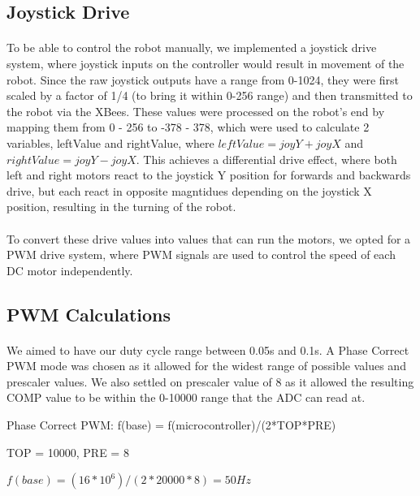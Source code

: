 \documentclass[12pt, a4paper]{article}
\begin{document}
    \subsection{Joystick Drive}
      \paragraph{}
      To be able to control the robot manually, we implemented a joystick drive system, where joystick inputs on the controller would result in movement of the robot. Since the raw joystick outputs have a range from 0-1024, they were first scaled by a factor of 1/4 (to bring it within 0-256 range) and then transmitted to the robot via the XBees.
      These values were processed on the robot's end by mapping them from 0 - 256 to -378 - 378, which were used to calculate 2 variables, leftValue and rightValue, where $leftValue = joyY + joyX$ and $rightValue = joyY - joyX$.
      This achieves a differential drive effect, where both left and right motors react to the joystick Y position for forwards and backwards drive, but each react in opposite magntidues depending on the joystick X position, resulting in the turning of the robot.
      \paragraph{}
      To convert these drive values into values that can run the motors, we opted for a PWM drive system, where PWM signals are used to control the speed of each DC motor independently.
    \subsection{PWM Calculations}
      \paragraph{}
        We aimed to have our duty cycle range between 0.05s and 0.1s.
        A Phase Correct PWM mode was chosen as it allowed for the widest range of possible values and prescaler values.
        We also settled on prescaler value of 8 as it allowed the resulting COMP value to be within the 0-10000 range that the ADC can read at.
  
        Phase Correct PWM: f(base) = f(microcontroller)/(2*TOP*PRE)
  
        TOP = 10000, PRE = 8
  
        $f(base) = (16*10^6) / (2*20000*8) = 50Hz$
      
\end{document}
